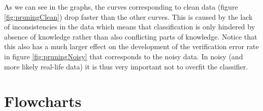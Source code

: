 \documentclass[11pt,a4paper]{article}
\begin{document}
As we can see in the graphs, the curves corresponding to clean data (figure \ref{fig:pruningClean}) drop faster than the other curves. This is caused by the lack of inconsistencies in the data which means that classification is only hindered by absence of knowledge rather than also conflicting parts of knowledge. Notice that this also has a much larger effect on the development of the verification error rate in figure \ref{fig:pruningNoisy} that corresponds to the noisy data. In noisy (and more likely real-life data) it is thus very important not to overfit the classifier.

\section{Flowcharts}

\begin{figure}[p]

\end{figure}
\end{document}
